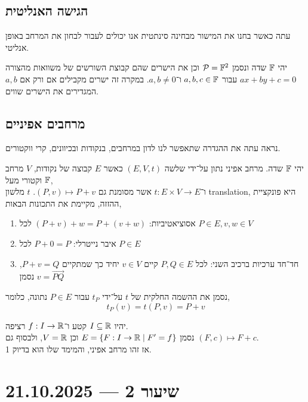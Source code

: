 \subsection{הגישה האנליטית}
עתה כאשר בחנו את המישור מבחינה סינתטית אנו יכולים לעבור לבחון את המרחב באופן אנליטי.
\begin{definition}
	יהי $\mathbb{F}$ שדה ונסמן $\mathcal{P} = \mathbb{F}^2$ וכן את הישרים שהם קבוצת השורשים של משוואות מהצורה $ax + by + c = 0$ עבור $a, b, c \in \mathbb{F}$ ו־$a, b \ne 0$.
	במקרה זה ישרים מקבילים אם ורק אם $a, b$ המגדירים את הישרים שווים.
\end{definition}

\subsection{מרחבים אפיניים}
נראה עתה את ההגדרה שתאפשר לנו לדון במרחבים, בנקודות ובכיוונים, קרי ווקטורים.
\begin{definition}
	יהי $\mathbb{F}$ שדה.
	מרחב אפיני נתון על־ידי שלשה $(E, V, t)$ כאשר $E$ קבוצה של נקודות, $V$ מרחב וקטורי מעל $\mathbb{F}$, \\
	ו־$t : E \times V \to E$ אשר מסומנת גם $(P, v) \mapsto P + v$.
	$t$ מלשון translation, היא פונקציית ההזזה, מקיימת את התכונות הבאות,
	\begin{enumerate}
		\item אסוציאטיביות: $(P + v) + w = P + (v + w)$ לכל $P \in E, v, w \in V$
		\item איבר נייטרלי: $P + 0 = P$ לכל $P \in E$
		\item חד־חד ערכיות ברכיב השני: לכל $P, Q \in E$ קיים $v \in V$ יחיד כך שמתקיים $P + v = Q$, נסמן $v = \overrightarrow{P Q}$
	\end{enumerate}
\end{definition}
\begin{notation}
	נסמן את ההשמה החלקית של $t$ על־ידי $t_P$ עבור $P \in E$ נתונה, כלומר,
	\[
		t_P(v)
		= t(P, v)
		= P + v
	\]
\end{notation}
\begin{example}
	יהיו $I \subseteq \mathbb{R}$ קטע ו־$f : I \to \mathbb{R}$ רציפה. \\
	נסמן $E = \{ F : I \to \mathbb{R} \mid F' = f \}$ וכן $V = \mathbb{R}$, ולבסוף גם $(F, c) \mapsto F + c$. \\
	אז זהו מרחב אפיני, והמימד שלו הוא בדיוק 1.
\end{example}

\section{שיעור 2 --- 21.10.2025}
